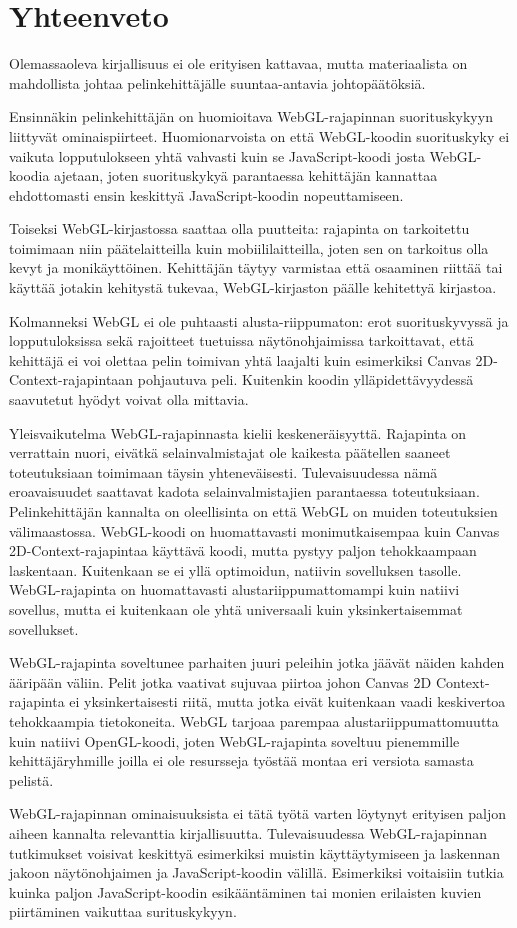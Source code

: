 \section{Yhteenveto}
\label{sec:johtopaatokset}

Olemassaoleva kirjallisuus ei ole erityisen kattavaa, mutta materiaalista on mahdollista johtaa pelinkehittäjälle suuntaa-antavia johtopäätöksiä.

Ensinnäkin pelinkehittäjän on huomioitava WebGL-rajapinnan suorituskykyyn liittyvät ominaispiirteet. Huomionarvoista on että WebGL-koodin suorituskyky ei vaikuta lopputulokseen yhtä vahvasti kuin se JavaScript-koodi josta WebGL-koodia ajetaan, joten suorituskykyä parantaessa kehittäjän kannattaa ehdottomasti ensin keskittyä JavaScript-koodin nopeuttamiseen. 

Toiseksi WebGL-kirjastossa saattaa olla puutteita: rajapinta on tarkoitettu toimimaan niin päätelaitteilla kuin mobiililaitteilla, joten sen on tarkoitus olla kevyt ja monikäyttöinen. Kehittäjän täytyy varmistaa että osaaminen riittää tai käyttää jotakin kehitystä tukevaa, WebGL-kirjaston päälle kehitettyä kirjastoa.

Kolmanneksi WebGL ei ole puhtaasti alusta-riippumaton: erot suorituskyvyssä ja lopputuloksissa sekä rajoitteet tuetuissa näytönohjaimissa tarkoittavat, että kehittäjä ei voi olettaa pelin toimivan yhtä laajalti kuin esimerkiksi Canvas 2D-Context-rajapintaan pohjautuva peli. Kuitenkin koodin ylläpidettävyydessä saavutetut hyödyt voivat olla mittavia.

Yleisvaikutelma WebGL-rajapinnasta kielii keskeneräisyyttä. Rajapinta on verrattain nuori, eivätkä selainvalmistajat ole kaikesta päätellen saaneet toteutuksiaan toimimaan täysin yhteneväisesti. Tulevaisuudessa nämä eroavaisuudet saattavat kadota selainvalmistajien parantaessa toteutuksiaan. Pelinkehittäjän kannalta on oleellisinta on että WebGL on muiden toteutuksien välimaastossa. WebGL-koodi on huomattavasti monimutkaisempaa kuin Canvas 2D-Context-rajapintaa käyttävä koodi, mutta pystyy paljon tehokkaampaan laskentaan. Kuitenkaan se ei yllä optimoidun, natiivin sovelluksen tasolle. WebGL-rajapinta on huomattavasti alustariippumattomampi kuin natiivi sovellus, mutta ei kuitenkaan ole yhtä universaali kuin yksinkertaisemmat sovellukset. 

WebGL-rajapinta soveltunee parhaiten juuri peleihin jotka jäävät näiden kahden ääripään väliin. Pelit jotka vaativat sujuvaa piirtoa johon Canvas 2D Context-rajapinta ei yksinkertaisesti riitä, mutta jotka eivät kuitenkaan vaadi keskivertoa tehokkaampia tietokoneita. WebGL tarjoaa parempaa alustariippumattomuutta kuin natiivi OpenGL-koodi, joten WebGL-rajapinta soveltuu pienemmille kehittäjäryhmille joilla ei ole resursseja työstää montaa eri versiota samasta pelistä. 

WebGL-rajapinnan ominaisuuksista ei tätä työtä varten löytynyt erityisen paljon aiheen kannalta relevanttia kirjallisuutta. Tulevaisuudessa WebGL-rajapinnan tutkimukset voisivat keskittyä esimerkiksi muistin käyttäytymiseen ja laskennan jakoon näytönohjaimen ja JavaScript-koodin välillä. Esimerkiksi voitaisiin tutkia kuinka paljon JavaScript-koodin esikääntäminen tai monien erilaisten kuvien piirtäminen vaikuttaa surituskykyyn.